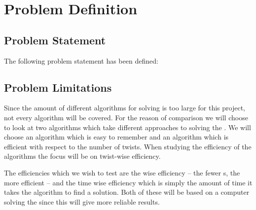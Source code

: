 \chapter{Problem Definition}
\emptyTop{}

\section{Problem Statement}
The following problem statement has been defined:




\section{Problem Limitations}
\label{sec:problemLimitations}
Since the amount of different algorithms for \rubik{} solving is too large for this project, not every algorithm will be covered.
For the reason of comparison we will choose to look at two algorithms which take different approaches to solving the \rubik{}.
We will choose an algorithm which is easy to remember and an algorithm which is efficient with respect to the number of twists. When studying the efficiency of the algorithms the focus will be on twist-wise efficiency.

The efficiencies which we wish to test are the \twist{} wise efficiency -- the fewer \twist{}s, the more efficient -- and the time wise efficiency which is simply the amount of time it takes the algorithm to find a solution.
Both of these will be based on a computer solving the \rubik{} since this will give more reliable results.

